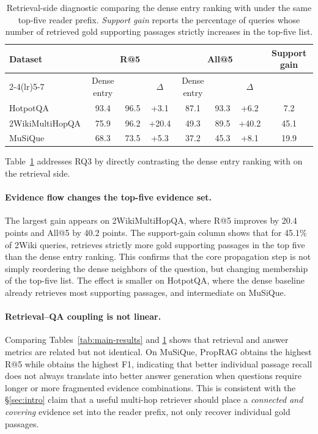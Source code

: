 \begin{table}[t]
\centering
\small
\setlength{\tabcolsep}{4pt}
\begin{tabular}{lccc ccc c}
\toprule
Dataset & \multicolumn{3}{c}{R@5} &
\multicolumn{3}{c}{All@5} &
Support gain \\
\cmidrule(lr){2-4}\cmidrule(lr){5-7}
& Dense entry & \methodname{} & $\Delta$ &
Dense entry & \methodname{} & $\Delta$ & \\
\midrule
HotpotQA & 93.4 & 96.5 & +3.1 & 87.1 & 93.3 & +6.2 & 7.2 \\
2WikiMultiHopQA & 75.9 & 96.2 & +20.4 & 49.3 & 89.5 & +40.2 & 45.1 \\
MuSiQue & 68.3 & 73.5 & +5.3 & 37.2 & 45.3 & +8.1 & 19.9 \\
\bottomrule
\end{tabular}
\caption{Retrieval-side diagnostic comparing the dense entry ranking
with \methodname{} under the same top-five reader prefix.
\emph{Support gain} reports the percentage of queries whose number of
retrieved gold supporting passages strictly increases in the top-five
list.}
\label{tab:flow-diagnostic}
\end{table}

Table~\ref{tab:flow-diagnostic} addresses RQ3 by directly contrasting
the dense entry ranking with \methodname{} on the retrieval side.
\paragraph{Evidence flow changes the top-five evidence set.}
The largest gain appears on 2WikiMultiHopQA, where R@5 improves by
20.4 points and All@5 by 40.2 points. The support-gain column shows
that for 45.1\% of 2Wiki queries, \methodname{} retrieves strictly
more gold supporting passages in the top five than the dense entry
ranking. This confirms that the core propagation step is not simply
reordering the dense neighbors of the question, but changing
membership of the top-five list. The effect is smaller on HotpotQA,
where the dense baseline already retrieves most supporting passages,
and intermediate on MuSiQue.

\paragraph{Retrieval--QA coupling is not linear.}
Comparing Tables~\ref{tab:main-results} and \ref{tab:flow-diagnostic}
shows that retrieval and answer metrics are related but not identical.
On MuSiQue, PropRAG obtains the highest R@5 while \methodname{} obtains
the highest F1, indicating that better individual passage recall does
not always translate into better answer generation when questions
require longer or more fragmented evidence combinations. This is
consistent with the \S\ref{sec:intro} claim that a useful multi-hop
retriever should place a \emph{connected and covering} evidence set
into the reader prefix, not only recover individual gold passages.

